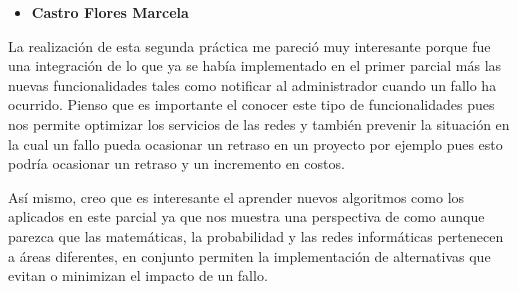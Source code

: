 \begin{itemize}
\item \textbf{Castro Flores Marcela}
\end{itemize}

La realización de esta segunda práctica me pareció muy interesante porque fue una integración de lo que ya se había implementado en el primer parcial más las nuevas funcionalidades tales como notificar al administrador cuando un fallo ha ocurrido.
Pienso que es importante el conocer este tipo de funcionalidades pues nos permite optimizar los servicios de las redes y también prevenir la situación en la cual un fallo pueda ocasionar un retraso en un proyecto por ejemplo pues esto podría ocasionar un retraso y un incremento en costos.
\\ \par
Así mismo, creo que es interesante el aprender nuevos algoritmos como los aplicados en este parcial ya que nos muestra una perspectiva de como aunque parezca que las matemáticas, la probabilidad y las redes informáticas pertenecen a áreas diferentes, en conjunto permiten la implementación de alternativas que evitan o minimizan el impacto de un fallo.